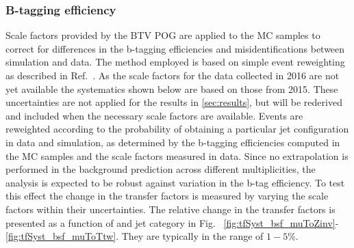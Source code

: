 \subsubsection*{B-tagging efficiency}
\label{sec:tfSyst_btag}
Scale factors provided by the BTV POG are applied to the MC samples
to correct for differences in the b-tagging efficiencies and 
misidentifications between simulation and data. The method employed is
based on simple event reweighting as described in
Ref.~\cite{btagSFMethods}. As the scale factors for the data collected in
2016 are not yet available the systematics shown below are based 
on those from 2015. These uncertainties are not applied for the results in \ref{sec:results},
but will be rederived and included when the necessary scale factors are available.
Events are reweighted according to the probability of obtaining a particular jet configuration in data
and simulation, as determined by the b-tagging efficiencies computed
in the MC samples and the scale factors measured in data.
Since no extrapolation is performed in the background prediction across different 
\nb  multiplicities, the analysis is expected to be robust against variation in the 
b-tag efficiency. 
To test this effect the change in the transfer factors is measured
by varying the scale factors within their uncertainties. 
The relative change in the transfer factors is presented as a function of \scalht and jet category 
in Fig. ~\ref{fig:tfSyst_bsf_muToZinv}-\ref{fig:tfSyst_bsf_muToTtw}.
They are typically in the range of $1-5\%$.


